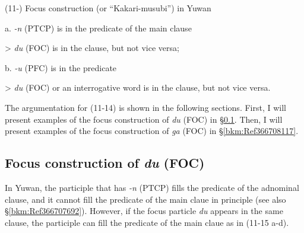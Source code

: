 (11\nobreakdash-)   Focus construction (or “Kakari-musubi”) in Yuwan

a.   \textit{{}-n} (PTCP) is in the predicate of the main clause

> \textit{du} (FOC) is in the clause, but not vice versa;

b.   \textit{{}-u} (PFC) is in the predicate

> \textit{du} (FOC) or an interrogative word is in the clause, but not vice versa.

The argumentation for (11-14) is shown in the following sections. First, I will present examples of the focus construction of \textit{du} (FOC) in §\ref{bkm:Ref366708110}. Then, I will present examples of the focus construction of \textit{ga} (FOC) in §\ref{bkm:Ref366708117}.

\subsection{Focus construction of \textit{du} (FOC)}
\label{bkm:Ref366708110}\hypertarget{RefHeadingToc395697262}{}
In Yuwan, the participle that has \textit{{}-n} (PTCP) fills the predicate of the adnominal clause, and it cannot fill the predicate of the main claue in principle (see also §\ref{bkm:Ref366707692}). However, if the focus particle \textit{du} appears in the same clause, the participle can fill the predicate of the main claue as in (11-15 a-d).

\tablefirsthead{}

